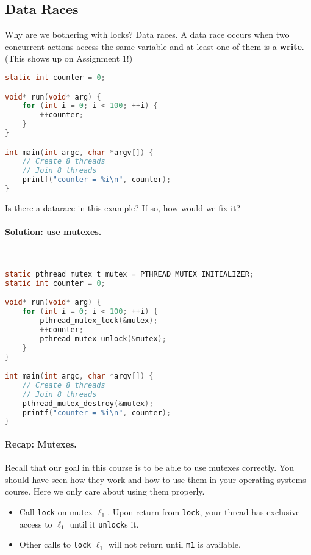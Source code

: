   \subsection*{Data Races}
  \vspace*{-1em}
Why are we bothering with locks? Data races. A data race occurs when
two concurrent actions access the same variable and at least one of
them is a {\bf write}. (This shows up on Assignment 1!)

  \begin{lstlisting}[language=C]
static int counter = 0;

void* run(void* arg) {
    for (int i = 0; i < 100; ++i) {
        ++counter;
    }
}

int main(int argc, char *argv[]) {
    // Create 8 threads
    // Join 8 threads
    printf("counter = %i\n", counter);
}
  \end{lstlisting}

Is there a datarace in this example? If so, how would we fix it?

\paragraph{Solution: use mutexes.}~

  \begin{lstlisting}[language=C]
static pthread_mutex_t mutex = PTHREAD_MUTEX_INITIALIZER;
static int counter = 0;

void* run(void* arg) {
    for (int i = 0; i < 100; ++i) {
        pthread_mutex_lock(&mutex);
        ++counter;
        pthread_mutex_unlock(&mutex);
    }
}

int main(int argc, char *argv[]) {
    // Create 8 threads
    // Join 8 threads
    pthread_mutex_destroy(&mutex);
    printf("counter = %i\n", counter);
}
  \end{lstlisting}
  
  
\paragraph{Recap: Mutexes.} Recall that our goal in this course is
to be able to use mutexes correctly. 
You should have seen how they work and how to use them in your operating systems course. Here we only care about using them properly.

\begin{itemize}
\item Call {\tt lock} on mutex $\ell_1$. Upon return from
      {\tt lock}, your thread has exclusive access to $\ell_1$ until it
      {\tt unlock}s it.
\item Other calls to {\tt lock} $\ell_1$ will not return
      until {\tt m1} is available.
\end{itemize}

